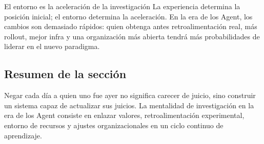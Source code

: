 \begin{importantbox}{El entorno es la aceleración de la investigación}
La experiencia determina la posición inicial; el entorno determina la aceleración. En la era de los Agent, los cambios son demasiado rápidos: quien obtenga antes retroalimentación real, más rollout, mejor infra y una organización más abierta tendrá más probabilidades de liderar en el nuevo paradigma.
\end{importantbox}

\subsection{Resumen de la sección}

Negar cada día a quien uno fue ayer no significa carecer de juicio, sino construir un sistema capaz de actualizar sus juicios. La mentalidad de investigación en la era de los Agent consiste en enlazar valores, retroalimentación experimental, entorno de recursos y ajustes organizacionales en un ciclo continuo de aprendizaje.

